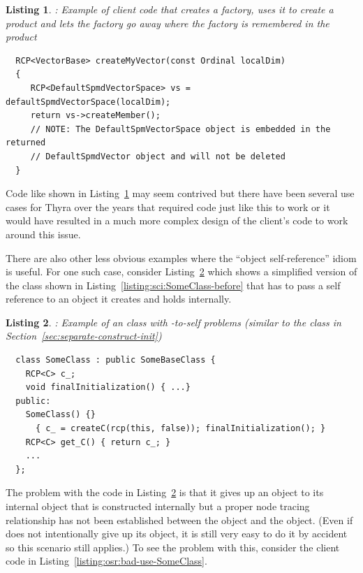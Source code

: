 \documentclass[pdf,ps2pdf,11pt]{SANDreport}
\newtheorem{listing}{Listing}
\begin{document}
{}\begin{listing}: Example of client code that creates a factory, uses
it to create a product and lets the factory go away where the factory
is remembered in the product
\label{listing:osr:DefaultSpmdVectorSpace-use-delete}
{\small\begin{verbatim}
  RCP<VectorBase> createMyVector(const Ordinal localDim)
  {
     RCP<DefaultSpmdVectorSpace> vs = defaultSpmdVectorSpace(localDim);
     return vs->createMember();
     // NOTE: The DefaultSpmVectorSpace object is embedded in the returned
     // DefaultSpmdVector object and will not be deleted
  }
\end{verbatim}}
\end{listing}


Code like shown in
Listing~\ref{listing:osr:DefaultSpmdVectorSpace-use-delete} may seem
contrived but there have been several use cases for Thyra over the
years that required code just like this to work or it would have
resulted in a much more complex design of the client's code to work
around this issue.

There are also other less obvious examples where the ``object
self-reference'' idiom is useful.  For one such case, consider
Listing~\ref{listing:osr:SomeClass-before} which shows a simplified
version of the class shown in
Listing~\ref{listing:sci:SomeClass-before} that has to pass a self
reference to an object it creates and holds internally.


{}\begin{listing}: Example of an class with {}-to-self
problems (similar to the class in
Section~\ref{sec:separate-construct-init})
\label{listing:osr:SomeClass-before}
{\small\begin{verbatim}
  class SomeClass : public SomeBaseClass {
    RCP<C> c_;
    void finalInitialization() { ...}
  public:
    SomeClass() {}
      { c_ = createC(rcp(this, false)); finalInitialization(); }
    RCP<C> get_C() { return c_; }
    ...
  };
\end{verbatim}}
\end{listing}


The problem with the code in
Listing~\ref{listing:osr:SomeClass-before} is that it gives up an
{} object to its internal {} object that is
constructed internally but a proper node tracing relationship has not
been established between the {} object and the
{} object.  (Even if {} does not
intentionally give up its {} object, it is still very easy
to do it by accident so this scenario still applies.)  To see the
problem with this, consider the client code in
Listing~\ref{listing:osr:bad-use-SomeClass}.
\end{document}
